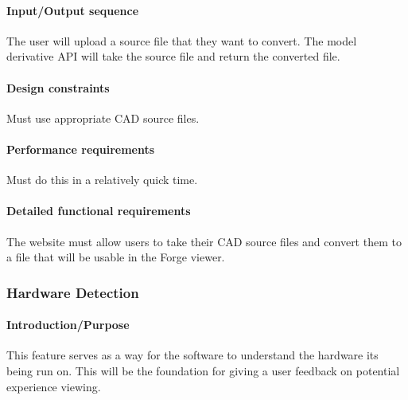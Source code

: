 \documentclass[letterpaper, 10pt, draftclsnofoot, compsoc, onecolumn]{IEEEtran}
\begin{document}
\paragraph[Input/Output sequence]{\rmfamily\bfseries\color{black}
Input/Output sequence }
{\color{black}
	The user will upload a source file that they want to convert. The model derivative API will take the source file and return the 
	converted file.
}

\paragraph[Design constraints]{\rmfamily\bfseries\color{black} Design
constraints }
{\color{black}
	Must use appropriate CAD source files. 
}

\paragraph[Performance requirements]{\rmfamily\bfseries\color{black}
Performance requirements }
{\color{black}
	Must do this in a relatively quick time.
}

\paragraph[Detailed functional requirements]{\rmfamily\bfseries\color{black}
Detailed functional requirements }
{\color{black}
	The website must allow users to take their CAD source files and convert them to a file that will be usable in the
	Forge viewer.    
}


\subsubsection[{Hardware Detection}]{\rmfamily\bfseries\color{black}  
	Hardware Detection
}

\paragraph[Introduction/Purpose of this
feature]{\rmfamily\bfseries\color{black}
Introduction/Purpose }
{\color{black}
	This feature serves as a way for the software to understand the hardware its being run on. This will be the foundation for 
	giving a user feedback on potential experience viewing.
}
\end{document}
